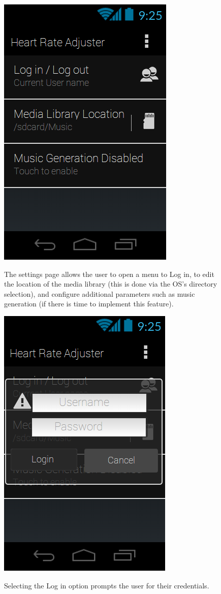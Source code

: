 \documentclass[letterpaper,english, 12pt]{scrreprt}
\begin{document}
\begin{figure}[H]
	\centering
	\includegraphics{img/mobile_ui/4.png}\\
	\caption{The settings page allows the user to open a menu to Log in, to edit the location of the media library (this is done via the OS's directory selection), and configure additional parameters such as music generation (if there is time to implement this feature).}
\end{figure}

\begin{figure}[H]
	\centering
	\includegraphics{img/mobile_ui/5.png}\\
	\caption{Selecting the Log in option prompts the user for their credentials.}
\end{figure}
\end{document}
